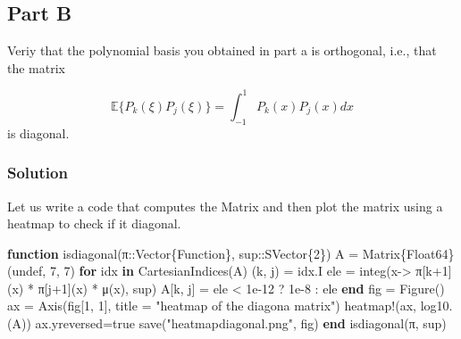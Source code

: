 \documentclass[
]{article}
\newenvironment{Shaded}{\begin{snugshade}}{\end{snugshade}}
\newcommand{\ConstantTok}[1]{\textcolor[rgb]{0.56,0.35,0.01}{#1}}
\newcommand{\ControlFlowTok}[1]{\textcolor[rgb]{0.00,0.23,0.31}{\textbf{#1}}}
\newcommand{\DataTypeTok}[1]{\textcolor[rgb]{0.68,0.00,0.00}{#1}}
\newcommand{\FloatTok}[1]{\textcolor[rgb]{0.68,0.00,0.00}{#1}}
\newcommand{\FunctionTok}[1]{\textcolor[rgb]{0.28,0.35,0.67}{#1}}
\newcommand{\KeywordTok}[1]{\textcolor[rgb]{0.00,0.23,0.31}{\textbf{#1}}}
\newcommand{\NormalTok}[1]{\textcolor[rgb]{0.00,0.23,0.31}{#1}}
\newcommand{\OperatorTok}[1]{\textcolor[rgb]{0.37,0.37,0.37}{#1}}
\newcommand{\StringTok}[1]{\textcolor[rgb]{0.13,0.47,0.30}{#1}}
\begin{document}
\subsection{Part B}\label{part-b}

Veriy that the polynomial basis you obtained in part a is orthogonal,
i.e., that the matrix

\begin{equation}\tag{2}\label{polybasis}
\mathbb{E}\{P_k(\xi)P_j(\xi)\} = \int_{-1}^{1} P_k(x)P_j(x)dx
\end{equation} is diagonal.

\subsubsection{Solution}\label{solution-1}

Let us write a code that computes the Matrix and then plot the matrix
using a heatmap to check if it diagonal.

\begin{Shaded}
\begin{Highlighting}[]
\KeywordTok{function} \FunctionTok{isdiagonal}\NormalTok{(}\ConstantTok{π}\OperatorTok{::}\DataTypeTok{Vector\{Function\}}\NormalTok{, sup}\OperatorTok{::}\DataTypeTok{SVector\{2\}}\NormalTok{)}
\NormalTok{    A }\OperatorTok{=} \FunctionTok{Matrix}\DataTypeTok{\{Float64\}}\NormalTok{(}\ConstantTok{undef}\NormalTok{, }\FloatTok{7}\NormalTok{, }\FloatTok{7}\NormalTok{)}
    \ControlFlowTok{for}\NormalTok{ idx }\KeywordTok{in} \FunctionTok{CartesianIndices}\NormalTok{(A)}
\NormalTok{        (k, j) }\OperatorTok{=}\NormalTok{ idx.I}
\NormalTok{        ele }\OperatorTok{=} \FunctionTok{integ}\NormalTok{(x}\OperatorTok{{-}\textgreater{}} \ConstantTok{π}\NormalTok{[k}\OperatorTok{+}\FloatTok{1}\NormalTok{](x) }\OperatorTok{*} \ConstantTok{π}\NormalTok{[j}\OperatorTok{+}\FloatTok{1}\NormalTok{](x) }\OperatorTok{*} \FunctionTok{μ}\NormalTok{(x), sup)}
\NormalTok{        A[k, j] }\OperatorTok{=}\NormalTok{ ele }\OperatorTok{\textless{}} \FloatTok{1e{-}12}\NormalTok{ ? }\FloatTok{1e{-}8} \OperatorTok{:}\NormalTok{ ele}
    \ControlFlowTok{end}
\NormalTok{    fig }\OperatorTok{=} \FunctionTok{Figure}\NormalTok{()}
\NormalTok{    ax }\OperatorTok{=} \FunctionTok{Axis}\NormalTok{(fig[}\FloatTok{1}\NormalTok{, }\FloatTok{1}\NormalTok{], title }\OperatorTok{=} \StringTok{"heatmap of the diagona matrix"}\NormalTok{)}
    \FunctionTok{heatmap!}\NormalTok{(ax, }\FunctionTok{log10}\NormalTok{.(A))}
\NormalTok{    ax.yreversed}\OperatorTok{=}\ConstantTok{true}
    \FunctionTok{save}\NormalTok{(}\StringTok{"heatmapdiagonal.png"}\NormalTok{, fig)}
\KeywordTok{end}
\FunctionTok{isdiagonal}\NormalTok{(}\ConstantTok{π}\NormalTok{, sup)}
\end{Highlighting}
\end{Shaded}
\end{document}
